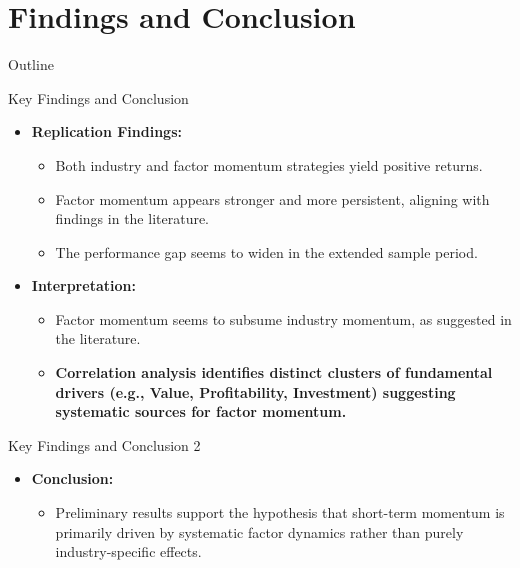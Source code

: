 \documentclass[t]{beamer}
\begin{document}
\section{Findings and Conclusion}

\begin{frame}{Outline}
\end{frame}

\begin{frame}{Key Findings and Conclusion}
\begin{itemize}
    \item \textbf{Replication Findings:}
    \begin{itemize}
        \item Both industry and factor momentum strategies yield positive returns.
        \item Factor momentum appears stronger and more persistent, aligning with findings in the literature.
        \item The performance gap seems to widen in the extended sample period.
    \end{itemize}
    \item \textbf{Interpretation:}
    \begin{itemize}
        \item Factor momentum seems to subsume industry momentum, as suggested in the literature.
        \item \textbf{Correlation analysis identifies distinct clusters of fundamental drivers (e.g., Value, Profitability, Investment) suggesting systematic sources for factor momentum.}
    \end{itemize}
\end{itemize}
\end{frame}


\begin{frame}{Key Findings and Conclusion 2}
  \begin{itemize}
    \item \textbf{Conclusion:}
    \begin{itemize}
        \item Preliminary results support the hypothesis that short-term momentum is primarily driven by systematic factor dynamics rather than purely industry-specific effects.
    \end{itemize}
  \end{itemize}
\end{frame}
\end{document}
